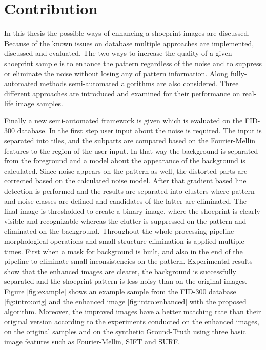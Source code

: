 \documentclass[draft,final]{vutinfth} %
\begin{document}
\section{Contribution}
\par
In this thesis the possible ways of enhancing a shoeprint images are discussed.
Because of the known issues on database multiple approaches are implemented, discussed and evaluated.
The two ways to increase the quality of a given shoeprint sample is to enhance the pattern regardless of the noise and to suppress or eliminate the noise without losing any of pattern information.
Along fully-automated methods semi-automated algorithms are also considered.
Three different approaches are introduced and examined for their performance on real-life image samples.
\par
Finally a new semi-automated framework is given which is evaluated on the FID-300 database.
In the first step user input about the noise is required.
The input is separated into tiles, and the subparts are compared based on the Fourier-Mellin features to the region of the user input.
In that way the background is separated from the foreground and a model about the appearance of the background is calculated.
Since noise appears on the pattern as well, the distorted parts are corrected based on the calculated noise model.
After that gradient based line detection is performed and the results are separated into clusters where pattern and noise classes are defined and candidates of the latter are eliminated.
The final image is thresholded to create a binary image, where the shoeprint is clearly visible and recognizable whereas the clutter is suppressed on the pattern and eliminated on the background.
Throughout the whole processing pipeline morphological operations and small structure elimination is applied multiple times.
First when a mask for background is built, and also in the end of the pipeline to eliminate small inconsistencies on the pattern.
Experimental results show that the enhanced images are clearer, the background is successfully separated and the shoeprint pattern is less noisy than on the original images.
Figure \ref{fig:example} shows an example sample from the FID-300 database \ref{fig:intro:orig} and the enhanced image \ref{fig:intro:enhanced} with the proposed algorithm.
Moreover, the improved images have a better matching rate than their original version according to the experiments conducted on the enhanced images, on the original samples and on the synthetic Ground-Truth using three basic image features such as Fourier-Mellin, SIFT and SURF.
\end{document}
